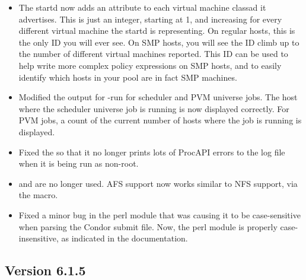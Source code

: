 \begin{itemize}
\item The startd now adds an  attribute to
each virtual machine classad it advertises.
This is just an integer, starting at 1, and increasing for every
different virtual machine the startd is representing.
On regular hosts, this is the only ID you will ever see.
On SMP hosts, you will see the ID climb up to the number of different
virtual machines reported.
This ID can be used to help write more complex policy expressions on
SMP hosts, and to easily identify which hosts in your pool are in fact
SMP machines.

\item Modified the output for  -run for scheduler and PVM
universe jobs.  The host where the scheduler universe job is running
is now displayed correctly.  For PVM jobs, a count of the current
number of hosts where the job is running is displayed.

\item Fixed the  so that it no longer prints lots of
ProcAPI errors to the log file when it is being run as non-root.

\item {} and  are no longer
used.  AFS support now works similar to NFS support, via the
 macro.

\item Fixed a minor bug in the  perl module that was
causing it to be case-sensitive when parsing the Condor submit file.
Now, the perl module is properly case-insensitive, as indicated in the
documentation.

\end{itemize}

\subsection{\label{sec:New-6-1-5}Version 6.1.5}

